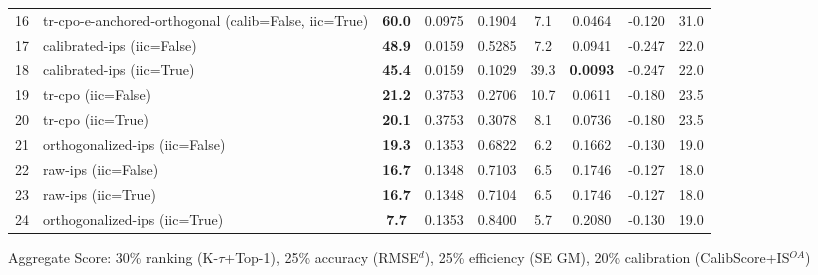 \begin{table}[htbp]
\begin{tabular}{cl|c|cccccc}
16 & tr-cpo-e-anchored-orthogonal (calib=False, iic=True) & \textbf{60.0} & 0.0975 & 0.1904 & 7.1 & 0.0464 & -0.120 & 31.0 \\
17 & calibrated-ips (iic=False) & \textbf{48.9} & 0.0159 & 0.5285 & 7.2 & 0.0941 & -0.247 & 22.0 \\
18 & calibrated-ips (iic=True) & \textbf{45.4} & 0.0159 & 0.1029 & 39.3 & \textbf{0.0093} & -0.247 & 22.0 \\
19 & tr-cpo (iic=False) & \textbf{21.2} & 0.3753 & 0.2706 & 10.7 & 0.0611 & -0.180 & 23.5 \\
20 & tr-cpo (iic=True) & \textbf{20.1} & 0.3753 & 0.3078 & 8.1 & 0.0736 & -0.180 & 23.5 \\
21 & orthogonalized-ips (iic=False) & \textbf{19.3} & 0.1353 & 0.6822 & 6.2 & 0.1662 & -0.130 & 19.0 \\
22 & raw-ips (iic=False) & \textbf{16.7} & 0.1348 & 0.7103 & 6.5 & 0.1746 & -0.127 & 18.0 \\
23 & raw-ips (iic=True) & \textbf{16.7} & 0.1348 & 0.7104 & 6.5 & 0.1746 & -0.127 & 18.0 \\
24 & orthogonalized-ips (iic=True) & \textbf{7.7} & 0.1353 & 0.8400 & 5.7 & 0.2080 & -0.130 & 19.0 \\
\bottomrule
\end{tabular}
\footnotesize{Aggregate Score: 30\% ranking (K-$\tau$+Top-1), 25\% accuracy (RMSE$^d$), 25\% efficiency (SE GM), 20\% calibration (CalibScore+IS$^{OA}$)}
\end{table}